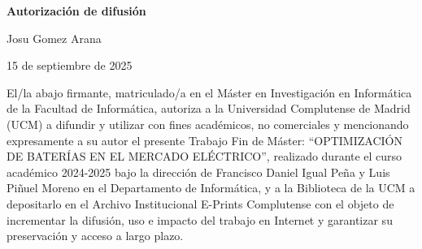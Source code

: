 \newpage

\thispagestyle{empty}

\begin{center}

  {\bf \Huge Autorización de difusión}

  \vspace{1cm}

  \large Josu Gomez Arana

  \vspace{0.5cm}

  15 de septiembre de 2025

  \vspace{0.5cm}

\end{center}

El/la abajo firmante, matriculado/a en el Máster en Investigación en Informática de la Facultad de Informática, autoriza a la Universidad Complutense de Madrid (UCM) a difundir y utilizar con fines académicos, no comerciales y mencionando expresamente a su autor el presente Trabajo Fin de Máster: “OPTIMIZACIÓN DE BATERÍAS EN EL MERCADO ELÉCTRICO”, realizado durante el curso académico 2024-2025 bajo la dirección de Francisco Daniel Igual Peña y Luis Piñuel Moreno en el Departamento de Informática, y a la Biblioteca de la UCM a depositarlo en el Archivo Institucional E-Prints Complutense con el objeto de incrementar la difusión, uso e impacto del trabajo en Internet y garantizar su preservación y acceso a largo plazo.
